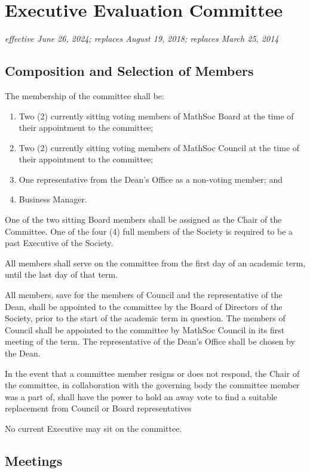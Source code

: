 \section{Executive Evaluation Committee}
\emph{effective June 26, 2024; replaces August 19, 2018; replaces March 25, 2014}\\

\subsection{Composition and Selection of Members}
The membership of the committee shall be:
\begin{enumerate}
	\item Two (2) currently sitting voting members of MathSoc Board at the time of their appointment to the committee;
	\item Two (2) currently sitting voting members of MathSoc Council at the time of their appointment to the committee;
	\item One representative from the Dean's Office as a non-voting member; and
	\item Business Manager.
\end{enumerate}

One of the two sitting Board members shall be assigned as the Chair of the Committee.
One of the four (4) full members of the Society is required to be a past Executive of the Society.

All members shall serve on the committee from the first day of an academic
term, until the last day of that term.

All members, save for the members of Council and the representative of the
Dean, shall be appointed to the committee by the Board of Directors of the
Society, prior to the start of the academic term in question. The members of
Council shall be appointed to the committee by MathSoc Council in its first
meeting of the term. The representative of the Dean's Office shall be chosen by
the Dean.

In the event that a committee member resigns or does not respond, the Chair of the committee, in collaboration with the governing body the committee member was a part of, shall have the power to hold an away vote to find a suitable replacement from Council or Board representatives

No current Executive may sit on the committee.

\subsection{Meetings}

